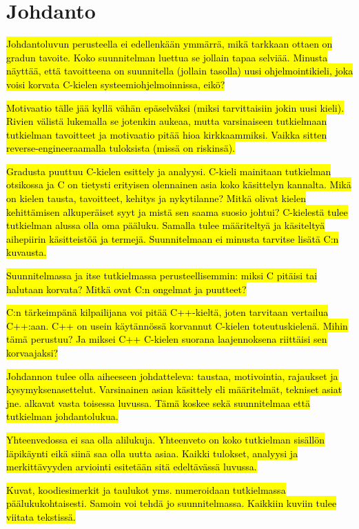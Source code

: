 \section{Johdanto} 

\hl{Johdantoluvun perusteella ei edellenkään ymmärrä, mikä tarkkaan ottaen on
gradun tavoite. Koko suunnitelman luettua se jollain tapaa selviää. Minusta
näyttää, että tavoitteena on suunnitella (jollain tasolla) uusi
ohjelmointikieli, joka voisi korvata C-kielen systeemiohjelmoinnissa, eikö?}

\hl{Motivaatio tälle jää kyllä vähän epäselväksi (miksi tarvittaisiin jokin
uusi kieli). Rivien välistä lukemalla se jotenkin aukeaa, mutta varsinaiseen
tutkielmaan tutkielman tavoitteet ja motivaatio pitää hioa kirkkaammiksi.
Vaikka sitten reverse-engineeraamalla tuloksista (missä on riskinsä).}

\hl{Gradusta puuttuu C-kielen esittely ja analyysi. C-kieli mainitaan
tutkielman otsikossa ja C on tietysti erityisen olennainen asia koko käsittelyn
kannalta. Mikä on kielen tausta, tavoitteet, kehitys ja nykytilanne? Mitkä
olivat kielen kehittämisen alkuperäiset syyt ja mistä sen saama suosio johtui?
C-kielestä tulee tutkielman alussa olla oma pääluku. Samalla tulee määriteltyä
ja käsiteltyä aihepiirin käsitteistöä ja termejä. Suunnitelmaan ei minusta
tarvitse lisätä C:n kuvausta.}

\hl{Suunnitelmassa ja itse tutkielmassa perusteellisemmin: miksi C pitäisi tai
halutaan korvata? Mitkä ovat C:n ongelmat ja puutteet?}

\hl{C:n tärkeimpänä kilpailijana voi pitää C++-kieltä, joten tarvitaan
vertailua C++:aan. C++ on usein käytännössä korvannut C-kielen toteutuskielenä.
Mihin tämä perustuu? Ja miksei C++ C-kielen suorana laajennoksena riittäisi sen
korvaajaksi?}

\hl{Johdannon tulee olla aiheeseen johdatteleva: taustaa, motivointia,
rajaukset ja kysymyksenasettelut. Varsinainen asian käsittely  eli määritelmät,
tekniset asiat jne. alkavat vasta toisessa luvussa. Tämä koskee sekä
suunnitelmaa että tutkielman johdantolukua.}

\hl{Yhteenvedossa ei saa olla alilukuja. Yhteenveto on koko tutkielman sisällön
läpikäynti eikä siinä saa olla uutta asiaa. Kaikki tulokset, analyysi ja
merkittävyyden arviointi esitetään sitä edeltävässä luvussa.}

\hl{Kuvat, koodiesimerkit ja taulukot yms. numeroidaan tutkielmassa
päälukukohtaisesti. Samoin voi tehdä jo suunnitelmassa. Kaikkiin kuviin tulee
viitata tekstissä.}


